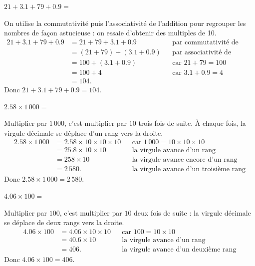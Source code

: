 \documentclass[answers]{exam}
\begin{document}
\begin{questions}
  \question $21 + 3.1 + 79 + 0.9 =$
  \begin{solution}
  On utilise la commutativité puis l’associativité de l’addition pour regrouper les nombres de façon astucieuse : on essaie d’obtenir des multiples de 10.
  \begin{align*}
    21 + 3.1 + 79 + 0.9
      &= 21 + 79 + 3.1 + 0.9 &&\text{par commutativité de l’addition} \\
      &= (21 + 79) + (3.1 + 0.9) &&\text{par associativité de l’addition} \\
      &= 100 + (3.1 + 0.9) &&\text{car } 21 + 79 = 100 \\
      &= 100 + 4 &&\text{car } 3.1 + 0.9 = 4 \\
      &= 104.
  \end{align*}
  Donc $21 + 3.1 + 79 + 0.9 = 104$.
  \end{solution}

  \question $2.58 \times 1\,000 =$
  \begin{solution}
  Multiplier par $1\,000$, c’est multiplier par $10$ trois fois de suite. À chaque fois, la virgule décimale se déplace d’un rang vers la droite.
  \begin{align*}
    2.58 \times 1\,000
      &= 2.58 \times 10 \times 10 \times 10 &&\text{car } 1\,000 = 10 \times 10 \times 10 \\
      &= 25.8 \times 10 \times 10 &&\text{la virgule avance d’un rang} \\
      &= 258 \times 10 &&\text{la virgule avance encore d’un rang} \\
      &= 2\,580. &&\text{la virgule avance d’un troisième rang}
  \end{align*}
  Donc $2.58 \times 1\,000 = 2\,580$.
  \end{solution}

  \question $4.06 \times 100 =$
  \begin{solution}
  Multiplier par $100$, c’est multiplier par $10$ deux fois de suite : la virgule décimale se déplace de deux rangs vers la droite.
  \begin{align*}
    4.06 \times 100
      &= 4.06 \times 10 \times 10 &&\text{car } 100 = 10 \times 10 \\
      &= 40.6 \times 10 &&\text{la virgule avance d’un rang} \\
      &= 406. &&\text{la virgule avance d’un deuxième rang}
  \end{align*}
  Donc $4.06 \times 100 = 406$.
  \end{solution}


\end{questions}
\end{document}
